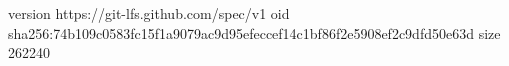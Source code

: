 version https://git-lfs.github.com/spec/v1
oid sha256:74b109c0583fc15f1a9079ac9d95efeccef14c1bf86f2e5908ef2c9dfd50e63d
size 262240
